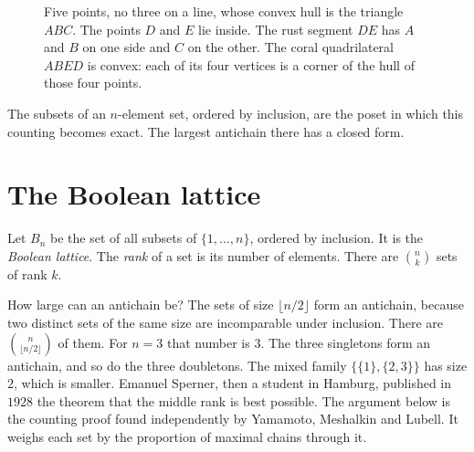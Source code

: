 \begin{figure}[ht]
\centering
{}
\caption{Five points, no three on a line, whose convex hull is the triangle $ABC$. The points $D$ and $E$ lie inside. The rust segment $DE$ has $A$ and $B$ on one side and $C$ on the other. The coral quadrilateral $ABED$ is convex: each of its four vertices is a corner of the hull of those four points.}
\label{orders:fig:klein}
\end{figure}

The subsets of an $n$-element set, ordered by inclusion, are the poset in which this counting becomes exact. The largest antichain there has a closed form.

\section{The Boolean lattice}

Let $B_n$ be the set of all subsets of $\{1,\dots,n\}$, ordered by inclusion. It is the \emph{Boolean lattice}. The \emph{rank} of a set is its number of elements. There are $\binom nk$ sets of rank $k$.

How large can an antichain be? The sets of size $\lfloor n/2\rfloor$ form an antichain, because two distinct sets of the same size are incomparable under inclusion. There are $\binom n{\lfloor n/2\rfloor}$ of them. For $n=3$ that number is $3$. The three singletons form an antichain, and so do the three doubletons. The mixed family $\{\{1\},\{2,3\}\}$ has size $2$, which is smaller. Emanuel Sperner, then a student in Hamburg, published in $1928$ the theorem that the middle rank is best possible. The argument below is the counting proof found independently by Yamamoto, Meshalkin and Lubell. It weighs each set by the proportion of maximal chains through it.

